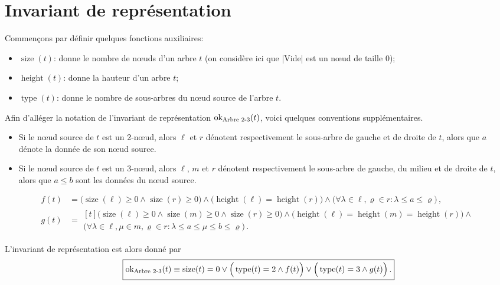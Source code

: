 \documentclass{elsarticle}
\newcommand{\ok}{\ensuremath{\textnormal{ok}_{\textnormal{Arbre 2-3}}}}
\DeclareMathOperator{\size}{size}
\DeclareMathOperator{\height}{height}
\DeclareMathOperator{\type}{type}
\renewcommand{\rho}{\varrho}
\begin{document}
\section{Invariant de représentation}
Commençons par définir quelques fonctions auxiliaires:
\begin{itemize}
	\item \(\size(t)\): donne le nombre de n\oe{}uds d'un arbre \(t\) (on considère ici que \inlinedafny|Vide| est un n\oe{}ud de taille \(0\));
	\item \(\height(t)\): donne la hauteur d'un arbre \(t\);
	\item \(\type(t)\): donne le nombre de sous-arbres du n\oe{}ud source de l'arbre \(t\).
\end{itemize}
Afin d'alléger la notation de l'invariant de représentation \(\ok(t)\), voici quelques conventions supplémentaires.
\begin{itemize}
	\item Si le n\oe{}ud source de \(t\) est un 2-n\oe{}ud, alors \(\ell\) et \(r\) dénotent respectivement le sous-arbre de gauche et de droite de \(t\), alors que \(a\) dénote la donnée de son n\oe{}ud source.
	\item Si le n\oe{}ud source de \(t\) est un 3-n\oe{}ud, alors \(\ell\), \(m\) et \(r\) dénotent respectivement le sous-arbre de gauche, du milieu et de droite de \(t\), alors que \(a \le b\) sont les données du n\oe{}ud source.
\end{itemize}
\begin{align}
f(t) &= \Big(\size(\ell) \ge 0 \land \size(r) \ge 0\Big) \land \Big(\height(\ell) = \height(r)\Big) \land \Big(\forall \lambda \in \ell, \rho \in r : \lambda \le a \le \rho \Big)\,,\\
g(t) &= \begin{multlined}[t] \Big(\size(\ell) \ge 0 \land \size(m) \ge 0 \land \size(r) \ge 0\Big) \land \Big(\height(\ell) = \height(m) = \height(r)\Big) \land {}\\ \Big(\forall \lambda \in \ell, \mu \in m, \rho \in r : \lambda \le a \le \mu \le b \le \rho \Big)\,.
\end{multlined}
\end{align}

L'invariant de représentation est alors donné par
\begin{equation}
\boxed{\ok(t) \equiv \size(t) = 0 \lor \Big(\type(t) = 2 \land f(t)\Big) \lor  \Big(\type(t) = 3 \land g(t)\Big)\,.}
\end{equation}
\end{document}
